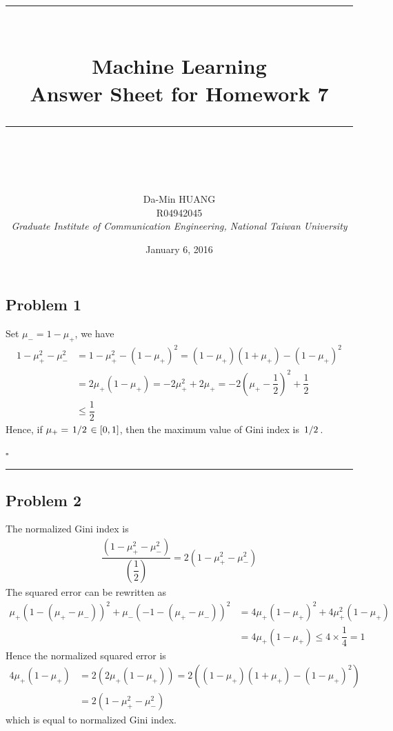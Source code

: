 \documentclass[12pt]{article}
\newcommand*{\QEDB}{\hfill\ensuremath{\square}}
\newcommand{\SBrackets}[1]{\left[#1\right]}
\newcommand{\ParTh}[1]{\left(#1\right)}
\newcommand{\Divide}[2]{\left.#1\middle/#2\right.}
\newcommand{\horrule}[1]{\rule{\linewidth}{#1}}
\begin{document}
\baselineskip 6.5mm
\setlength{\parindent}{0pt}
\title{ 
\normalfont \normalsize 
\horrule{0.5pt} \\[0.4cm]
\huge { \Huge Machine Learning \\ \large Answer Sheet for Homework 7}\\
\horrule{2pt} \\ [0.5cm]
}
\author{ { \Large Da-Min HUANG } \\
{\small R04942045} \\
{\small\textit{Graduate Institute of Communication Engineering, National Taiwan University}}
}
\date{January 6, 2016}
\maketitle

\subsection*{Problem 1}

Set $\mu_-=1-\mu_+$, we have
\begin{align}
1-\mu^2_+-\mu^2_-&=1-\mu^2_+-\ParTh{1-\mu_+}^2=\ParTh{1-\mu_+}\ParTh{1+\mu_+}-\ParTh{1-\mu_+}^2\\
&=2\mu_+\ParTh{1-\mu_+}=-2\mu^2_++2\mu_+=-2\ParTh{\mu_+-\dfrac{1}{2}}^2+\dfrac{1}{2}\\
&\leq\dfrac{1}{2}
\end{align}
Hence, if $\mu_+=\Divide{1}{2}\in\SBrackets{0,1}$, then the maximum value of Gini index is $\Divide{1}{2}$.

\QEDB

\horrule{0.5pt}

\subsection*{Problem 2}

The normalized Gini index is
\begin{align}
\dfrac{\ParTh{1-\mu^2_+-\mu^2_-}}{\ParTh{\dfrac{1}{2}}}=2\ParTh{1-\mu^2_+-\mu^2_-}
\end{align}
The squared error can be rewritten as
\begin{align}
\mu_+\ParTh{1-\ParTh{\mu_+-\mu_-}}^2+\mu_-\ParTh{-1-\ParTh{\mu_+-\mu_-}}^2&=4\mu_+\ParTh{1-\mu_+}^2+4\mu^2_+\ParTh{1-\mu_+}\\
&=4\mu_+\ParTh{1-\mu_+}\leq4\times\dfrac{1}{4}=1
\end{align}
Hence the normalized squared error is
\begin{align}
4\mu_+\ParTh{1-\mu_+}&=2\ParTh{2\mu_+\ParTh{1-\mu_+}}=2\ParTh{\ParTh{1-\mu_+}\ParTh{1+\mu_+}-\ParTh{1-\mu_+}^2}\\
&=2\ParTh{1-\mu^2_+-\mu^2_-}
\end{align}
which is equal to normalized Gini index.
\end{document}
